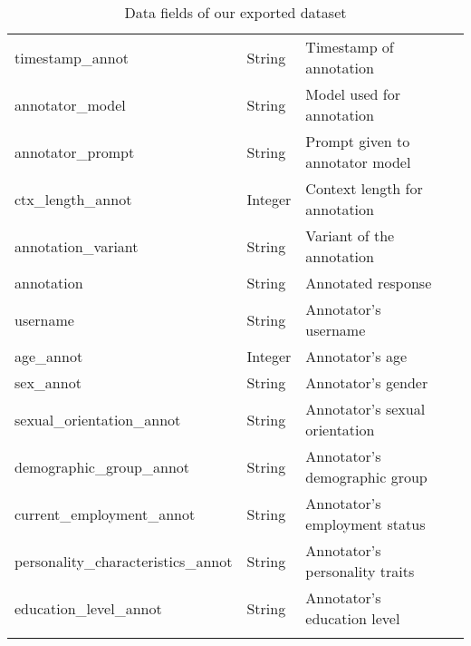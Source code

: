 \begin{longtable}{|l|l|l|p{4cm}|}
    timestamp\_annot & String & Timestamp of annotation \\
    annotator\_model & String & Model used for annotation \\
    annotator\_prompt & String & Prompt given to annotator model \\
    ctx\_length\_annot & Integer & Context length for annotation \\
    annotation\_variant & String & Variant of the annotation \\
    annotation & String & Annotated response \\
    username & String & Annotator's username \\
    age\_annot & Integer & Annotator's age \\
    sex\_annot & String & Annotator's gender \\
    sexual\_orientation\_annot & String & Annotator's sexual orientation \\
    demographic\_group\_annot & String & Annotator's demographic group \\
    current\_employment\_annot & String & Annotator's employment status \\    personality\_characteristics\_annot & String & Annotator's personality traits \\
    education\_level\_annot & String & Annotator's education level \\
    \caption{Data fields of our exported dataset}
	\label{tab:dataset}
\end{longtable}